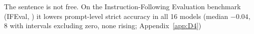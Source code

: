 The sentence is not free. On the Instruction-Following Evaluation benchmark (IFEval, \citealp{zhou2023ifeval}) it lowers prompt-level strict accuracy in all 16 models (median $-0.04$, 8 with intervals excluding zero, none rising; Appendix~\ref{app:D4})
